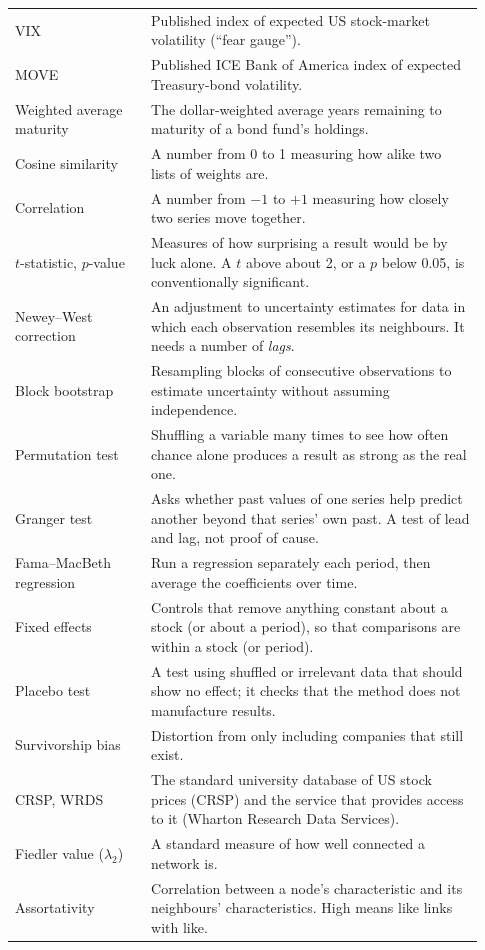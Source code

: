 \begin{longtable}{p{0.27\linewidth}p{0.66\linewidth}}
VIX & Published index of expected US stock-market volatility (``fear gauge'').\\
MOVE & Published ICE Bank of America index of expected Treasury-bond volatility.\\
Weighted average maturity & The dollar-weighted average years remaining to maturity of a bond fund's holdings.\\
Cosine similarity & A number from 0 to 1 measuring how alike two lists of weights are.\\
Correlation & A number from $-1$ to $+1$ measuring how closely two series move together.\\
$t$-statistic, $p$-value & Measures of how surprising a result would be by luck alone. A $t$ above about 2, or a $p$ below 0.05, is conventionally significant.\\
Newey--West correction & An adjustment to uncertainty estimates for data in which each observation resembles its neighbours. It needs a number of \emph{lags}.\\
Block bootstrap & Resampling blocks of consecutive observations to estimate uncertainty without assuming independence.\\
Permutation test & Shuffling a variable many times to see how often chance alone produces a result as strong as the real one.\\
Granger test & Asks whether past values of one series help predict another beyond that series' own past. A test of lead and lag, not proof of cause.\\
Fama--MacBeth regression & Run a regression separately each period, then average the coefficients over time.\\
Fixed effects & Controls that remove anything constant about a stock (or about a period), so that comparisons are within a stock (or period).\\
Placebo test & A test using shuffled or irrelevant data that should show no effect; it checks that the method does not manufacture results.\\
Survivorship bias & Distortion from only including companies that still exist.\\
CRSP, WRDS & The standard university database of US stock prices (CRSP) and the service that provides access to it (Wharton Research Data Services).\\
Fiedler value ($\lambda_2$) & A standard measure of how well connected a network is.\\
Assortativity & Correlation between a node's characteristic and its neighbours' characteristics. High means like links with like.\\
\bottomrule
\end{longtable}

